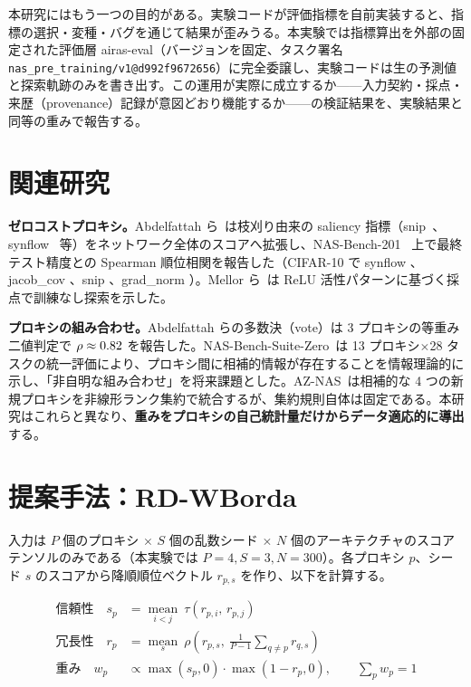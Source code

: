 \documentclass[11pt]{article}
\begin{document}
本研究にはもう一つの目的がある。実験コードが評価指標を自前実装すると、指標の選択・変種・バグを通じて結果が歪みうる。本実験では指標算出を外部の固定された評価層 airas-eval（バージョンを固定、タスク署名 \texttt{nas\_pre\_training/v1@d992f9672656}）に完全委譲し、実験コードは生の予測値と探索軌跡のみを書き出す。この運用が実際に成立するか——入力契約・採点・来歴（provenance）記録が意図どおり機能するか——の検証結果を、実験結果と同等の重みで報告する。

\section{関連研究}
\textbf{ゼロコストプロキシ。}Abdelfattah ら~\cite{abdelfattah-2021-zero}は枝刈り由来の saliency 指標（snip~\cite{lee-2019-snip}、synflow~\cite{tanaka-2020-synflow} 等）をネットワーク全体のスコアへ拡張し、NAS-Bench-201~\cite{dong-2020-nas} 上で最終テスト精度との Spearman 順位相関を報告した（CIFAR-10 で synflow 、jacob\_cov 、snip 、grad\_norm ）。Mellor ら~\cite{mellor-2020-neural}は ReLU 活性パターンに基づく採点で訓練なし探索を示した。

\textbf{プロキシの組み合わせ。}Abdelfattah らの多数決（vote）は 3 プロキシの等重み二値判定で $\rho \approx 0.82$ を報告した。NAS-Bench-Suite-Zero~\cite{krishnakumar-2022-nas}は 13 プロキシ$\times$28 タスクの統一評価により、プロキシ間に相補的情報が存在することを情報理論的に示し、「非自明な組み合わせ」を将来課題とした。AZ-NAS~\cite{lee-2024-nas}は相補的な 4 つの新規プロキシを非線形ランク集約で統合するが、集約規則自体は固定である。本研究はこれらと異なり、\textbf{重みをプロキシの自己統計量だけからデータ適応的に導出}する。

\section{提案手法：RD-WBorda}
入力は $P$ 個のプロキシ $\times$ $S$ 個の乱数シード $\times$ $N$ 個のアーキテクチャのスコアテンソルのみである（本実験では $P{=}4, S{=}3, N{=}300$）。各プロキシ $p$、シード $s$ のスコアから降順順位ベクトル $r_{p,s}$ を作り、以下を計算する。

\begin{align}
\text{信頼性}\quad s_p &= \operatorname*{mean}_{i<j} \ \tau\!\left(r_{p,i},\, r_{p,j}\right)\\
\text{冗長性}\quad r_p &= \operatorname*{mean}_{s} \ \rho\!\left(r_{p,s},\ \tfrac{1}{P-1}\textstyle\sum_{q\neq p} r_{q,s}\right)\\
\text{重み}\quad w_p &\propto \max(s_p, 0)\cdot \max(1-r_p, 0), \qquad \textstyle\sum_p w_p = 1
\end{align}
\end{document}
